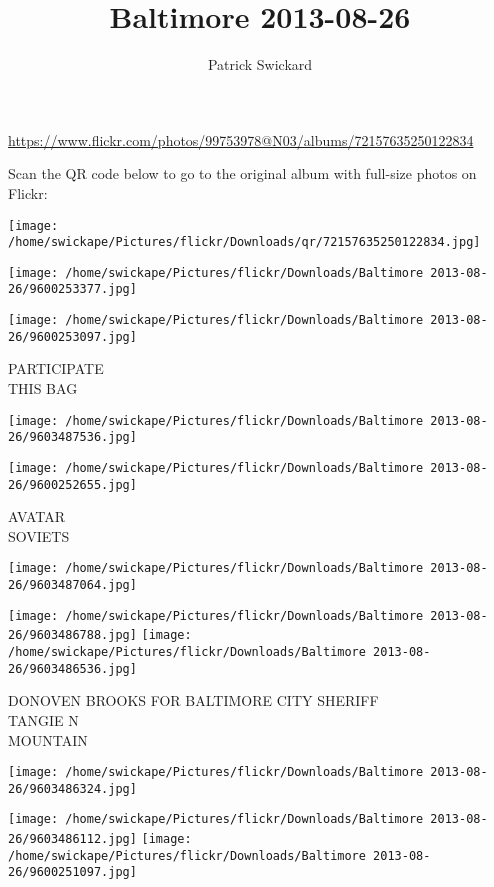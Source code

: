 \documentclass[10pt,letterpaper]{article}
\title{Baltimore 2013-08-26}
\author{Patrick Swickard}
\date{}
\begin{document}
\maketitle

\url{https://www.flickr.com/photos/99753978@N03/albums/72157635250122834}

Scan the QR code below to go to the original album with full-size photos on Flickr:

\texttt{[image: /home/swickape/Pictures/flickr/Downloads/qr/72157635250122834.jpg]}
\pagebreak

\texttt{[image: /home/swickape/Pictures/flickr/Downloads/Baltimore 2013-08-26/9600253377.jpg]}

\vspace{0.25in}
\texttt{[image: /home/swickape/Pictures/flickr/Downloads/Baltimore 2013-08-26/9600253097.jpg]}

PARTICIPATE\\
THIS BAG
\pagebreak

\texttt{[image: /home/swickape/Pictures/flickr/Downloads/Baltimore 2013-08-26/9603487536.jpg]}

\vspace{0.25in}
\texttt{[image: /home/swickape/Pictures/flickr/Downloads/Baltimore 2013-08-26/9600252655.jpg]}

AVATAR\\
SOVIETS
\pagebreak

\texttt{[image: /home/swickape/Pictures/flickr/Downloads/Baltimore 2013-08-26/9603487064.jpg]}

\vspace{0.25in}
\texttt{[image: /home/swickape/Pictures/flickr/Downloads/Baltimore 2013-08-26/9603486788.jpg]}
\texttt{[image: /home/swickape/Pictures/flickr/Downloads/Baltimore 2013-08-26/9603486536.jpg]}

DONOVEN BROOKS FOR BALTIMORE CITY SHERIFF\\
TANGIE N\\
MOUNTAIN
\pagebreak

\texttt{[image: /home/swickape/Pictures/flickr/Downloads/Baltimore 2013-08-26/9603486324.jpg]}

\vspace{0.25in}
\texttt{[image: /home/swickape/Pictures/flickr/Downloads/Baltimore 2013-08-26/9603486112.jpg]}
\texttt{[image: /home/swickape/Pictures/flickr/Downloads/Baltimore 2013-08-26/9600251097.jpg]}
\end{document}
